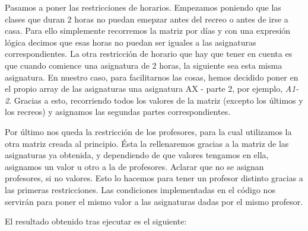 \documentclass[11pt,a4paper]{article}
\begin{document}
Pasamos a poner las restricciones de horarios. Empezamos poniendo que las clases que duran 2 horas no puedan emepzar antes del recreo o antes
de irse a casa. Para ello simplemente recorremos la matriz por días y con una expresión lógica decimos que esas horas no puedan ser iguales a
las asignaturas correspondientes. La otra restricción de horario que hay que tener en cuenta es que cuando comience una asignatura de 2 horas,
la siguiente sea esta misma asignatura. En nuestro caso, para facilitarnos las cosas, hemos decidido poner en el propio array de las asignaturas
una asignatura AX - parte 2, por ejemplo, \textit{A1-2}. Gracias a esto, recorriendo todos los valores de la matriz (excepto los últimos y los
recreos) y asignamos las segundas partes correspondientes.

Por último nos queda la restricción de los profesores, para la cual utilizamos la otra matriz creada al principio. Ésta la rellenaremos gracias
a la matriz de las asignaturas ya obtenida, y dependiendo de que valores tengamos en ella, asignamos un valor u otro a la de profesores. Aclarar
que no se asignan profesores, si no valores. Esto lo hacemos para tener un profesor distinto gracias a las primeras restricciones. Las
condiciones implementadas en el código  nos servirán para poner el mismo valor a las asignaturas dadas por el mismo profesor.

El resultado obtenido tras ejecutar es el siguiente:
\begin{table}[H]
    \centering
    \end{table}
\end{document}
